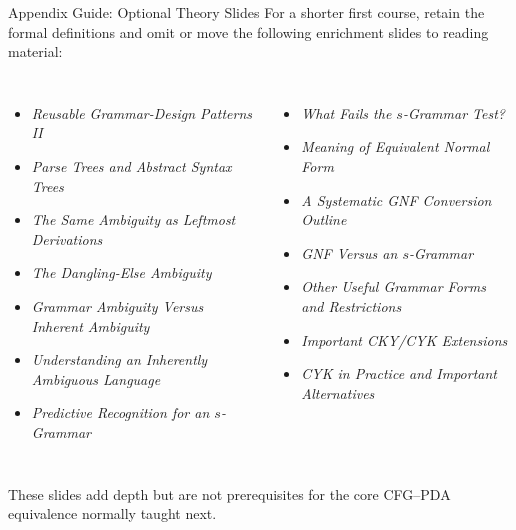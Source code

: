 \documentclass[10pt]{beamer}
\begin{document}
\begin{frame}{Appendix Guide: Optional Theory Slides}
  \footnotesize
  For a shorter first course, retain the formal definitions and omit or move
  the following enrichment slides to reading material:
  \begin{columns}[T]
    \begin{itemize}
      \item \textit{Reusable Grammar-Design Patterns II}
      \item \textit{Parse Trees and Abstract Syntax Trees}
      \item \textit{The Same Ambiguity as Leftmost Derivations}
      \item \textit{The Dangling-Else Ambiguity}
      \item \textit{Grammar Ambiguity Versus Inherent Ambiguity}
      \item \textit{Understanding an Inherently Ambiguous Language}
      \item \textit{Predictive Recognition for an $s$-Grammar}
    \end{itemize}
    \begin{itemize}
      \item \textit{What Fails the $s$-Grammar Test?}
      \item \textit{Meaning of Equivalent Normal Form}
      \item \textit{A Systematic GNF Conversion Outline}
      \item \textit{GNF Versus an $s$-Grammar}
      \item \textit{Other Useful Grammar Forms and Restrictions}
      \item \textit{Important CKY/CYK Extensions}
      \item \textit{CYK in Practice and Important Alternatives}
    \end{itemize}
  \end{columns}
  These slides add depth but are not prerequisites for the core CFG--PDA
  equivalence normally taught next.
\end{frame}
\end{document}
